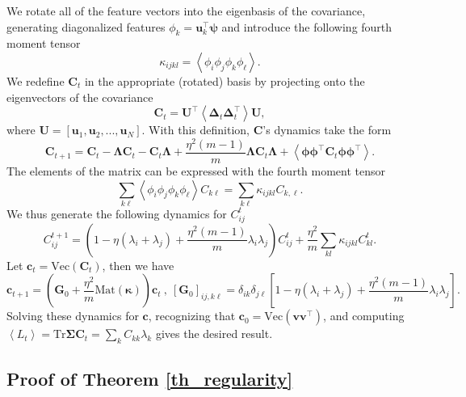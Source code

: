 \documentclass{article} %
\def\bSigma{\mathbf \Sigma}
\def\u{\mathbf u}
\def\G{\mathbf G}
\def\C{\mathbf C}
\begin{document}
We rotate all of the feature vectors into the eigenbasis of the covariance, generating diagonalized features $\phi_k = \u_k^\top \bm\psi$ and introduce the following fourth moment tensor
\begin{equation}
    \kappa_{ijkl} = \left< \phi_i \phi_j \phi_k \phi_\ell \right>.
\end{equation}
%
We redefine $\C_t$ in the appropriate (rotated) basis by projecting onto the eigenvectors of the covariance
\begin{equation}
    \C_t = \mathbf{U}^\top \left< \bm\Delta_t \bm\Delta_t^\top \right> \mathbf{U},
\end{equation}
%
where $\mathbf{U} = [\u_1,\u_2,...,\u_N]$. With this definition, $\C$'s dynamics take the form
\begin{equation}
    \C_{t+1} = \C_t - \mathbf{\Lambda} \C_t - \C_t \mathbf{\Lambda} + \frac{\eta^2 (m-1)}{m} \mathbf{\Lambda} \C_t \mathbf{\Lambda} + \left< \bm\phi \bm\phi^\top \C_t \bm\phi \bm\phi^\top \right>.
\end{equation}
%
The elements of the matrix can be expressed with the fourth moment tensor
\begin{equation}
    \sum_{k\ell} \left< \phi_i \phi_{j} \phi_k \phi_{\ell} \right> C_{k\ell} = \sum_{k\ell} \kappa_{ijkl} C_{k,\ell}.
\end{equation}
%
We thus generate the following dynamics for $C_{ij}^t$ 
%
\begin{equation}
    C_{ij}^{t+1} = \left (1-\eta(\lambda_i + \lambda_j) +  \frac{\eta^2(m-1)}{m} \lambda_i \lambda_j \right) C_{ij}^t +\frac{\eta^2}{m} \sum_{kl} \kappa_{ijkl} C_{kl}^t.
\end{equation}
%
Let $\mathbf{c}_t = \text{Vec}(\C_t)$, then we have
\begin{equation}
    \mathbf{c}_{t+1} = \left( \G_0 + \frac{\eta^2}{m } \text{Mat}(\bm\kappa) \right) \mathbf{c}_t \ , \ [\G_0]_{ij,k\ell} = \delta_{ik}\delta_{j\ell} \left[ 1 - \eta (\lambda_i+\lambda_j) + \frac{\eta^2(m-1)}{m} \lambda_i\lambda_j \right].
\end{equation}
%
Solving these dynamics for $\mathbf{c}$, recognizing that $\mathbf{c}_0 = \text{Vec}(\mathbf{v}\mathbf{v}^\top )$, and computing $\left< L_t \right> = \text{Tr} \bSigma \C_t = \sum_{k} C_{kk} \lambda_k$ gives the desired result. 


\subsection{Proof of Theorem \ref{th_regularity}}\label{app_proof_regularity}
\end{document}

